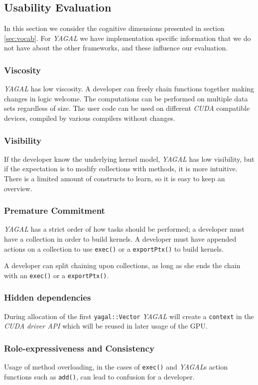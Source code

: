 \subsection{Usability Evaluation}
In this section we consider the cognitive dimensions presented in section \ref{sec:vocab}. For \textit{YAGAL} we have implementation specific information that we do not have about the other frameworks, and these influence our evaluation.

\subsubsection[*]{Viscosity}
\textit{YAGAL} has low viscosity. A developer can freely chain functions together making changes in logic welcome. The computations can be performed on multiple data sets regardless of size. The user code can be used on different \textit{CUDA} compatible devices, compiled by various compilers without changes.

\subsubsection[*]{Visibility}
If the developer know the underlying kernel model, \textit{YAGAL} has low visibility, but if the expectation is to modify collections with methods, it is more intuitive. There is a limited amount of constructs to learn, so it is easy to keep an overview.

\subsubsection[*]{Premature Commitment}
\textit{YAGAL} has a strict order of how tasks should be performed; a developer must have a collection in order to build kernels. A developer must have appended actions on a collection to use \texttt{exec()} or a \texttt{exportPtx()} to build kernels. 

A developer can split chaining upon collections, as long as she ends the chain with an \texttt{exec()} or a \texttt{exportPtx()}.

\subsubsection[*]{Hidden dependencies}
During allocation of the first \texttt{yagal::Vector} \textit{YAGAL} will create a \texttt{context} in the \textit{CUDA driver API} which will be reused in later usage of the GPU. 

\subsubsection[*]{Role-expressiveness and Consistency}
Usage of method overloading, in the cases of \texttt{exec()} and \textit{YAGAL}s action functions such as \texttt{add()}, can lead to confusion for a developer. 

